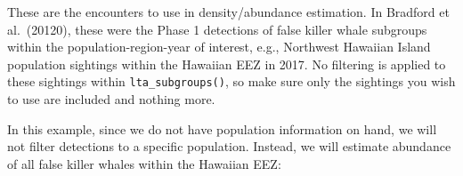 \documentclass[
]{book}
\newenvironment{Shaded}{\begin{snugshade}}{\end{snugshade}}
\newcommand{\ConstantTok}[1]{\textcolor[rgb]{0.56,0.35,0.01}{#1}}
\newcommand{\DecValTok}[1]{\textcolor[rgb]{0.00,0.00,0.81}{#1}}
\newcommand{\FunctionTok}[1]{\textcolor[rgb]{0.13,0.29,0.53}{\textbf{#1}}}
\newcommand{\NormalTok}[1]{#1}
\newcommand{\OtherTok}[1]{\textcolor[rgb]{0.56,0.35,0.01}{#1}}
\newcommand{\SpecialCharTok}[1]{\textcolor[rgb]{0.81,0.36,0.00}{\textbf{#1}}}
\newcommand{\StringTok}[1]{\textcolor[rgb]{0.31,0.60,0.02}{#1}}
\begin{document}
These are the encounters to use in density/abundance estimation. In Bradford et al.~(20120), these were the Phase 1 detections of false killer whale subgroups within the population-region-year of interest, e.g., Northwest Hawaiian Island population sightings within the Hawaiian EEZ in 2017. No filtering is applied to these sightings within \texttt{lta\_subgroups()}, so make sure only the sightings you wish to use are included and nothing more.

In this example, since we do not have population information on hand, we will not filter detections to a specific population. Instead, we will estimate abundance of all false killer whales within the Hawaiian EEZ:

\begin{Shaded}
\end{Shaded}
\end{document}
